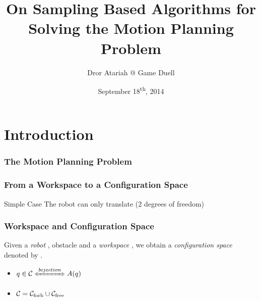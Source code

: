 \documentclass{beamer}
\author[D. Atariah]{Dror Atariah @ Game Duell}
\title[Motion Planning Problem]{On Sampling Based Algorithms for Solving the Motion Planning Problem}
\date{September 18\textsuperscript{th}, 2014}
\begin{document}
\begin{frame}[plain]
  \titlepage
\end{frame}

\section*{Introduction}
\begin{frame}
  \frametitle{The Motion Planning Problem}
  \begin{center}
    
  \end{center}
\end{frame}

\begin{frame}
  \frametitle{From a Workspace to a Configuration Space }
  \begin{block}{Simple Case}
    The robot can only translate (\(2\) degrees of freedom)
  \end{block}
  \begin{center}
    
  \end{center}
\end{frame}

\begin{frame}
  \frametitle{Workspace and Configuration Space}
  \begin{definition}
    Given a \emph{robot} \robot{}, obstacle \obst{} and a \emph{workspace} \wspace{}, we obtain a \emph{configuration space} denoted by \cspace{}.
    \begin{itemize}
    \item \(q \in \cspace \xLeftrightarrow{bijection} \robot(q)\)
    \item \(\mathcal{C} = \mathcal{C}_{\text{forb}} \cup \mathcal{C}_{\text{free}}\)
    \end{itemize}
  \end{definition}

  \begin{center}
    
  \end{center}
\end{frame}
\end{document}

